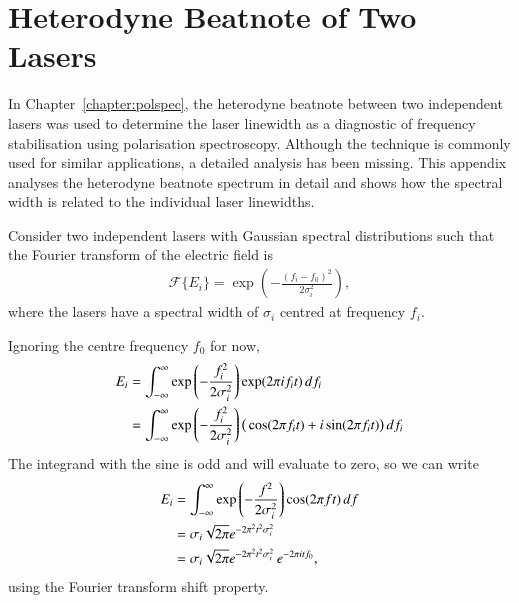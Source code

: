 \chapter{Heterodyne Beatnote of Two Lasers}\label{appendix:heterodyne}

In Chapter~\ref{chapter:polspec}, the heterodyne beatnote between two independent lasers was used to determine the laser linewidth as a diagnostic of frequency stabilisation using polarisation spectroscopy.
Although the technique is commonly used for similar applications, a detailed analysis has been missing.
This appendix analyses the heterodyne beatnote spectrum in detail and shows how the spectral width is related to the individual laser linewidths.

Consider two independent lasers with Gaussian spectral distributions such that the Fourier transform of the electric field is
\begin{align}
\mathcal{F}\{E_i\} = \exp\left(-\frac{(f_i-f_0)^2}{2\sigma_i^2}\right),
\end{align}
where the lasers have a spectral width of $\sigma_i$ centred at frequency $f_i$.

Ignoring the centre frequency $f_0$ for now,
\begin{align}
E_i &= \int_{-\infty}^{\infty} \exp\left(-\frac{f_i^2}{2\sigma_i^2}\right) \exp(2\pi i f_i t) \,df_i\notag\\
&= \int_{-\infty}^{\infty} \exp\left(-\frac{f_i^2}{2\sigma_i^2}\right) \big(\cos(2\pi f_i t) + i\sin(2\pi f_i t)\big) \,df_i
\end{align}
The integrand with the sine is odd and will evaluate to zero, so we can write
\begin{align}
E_i &= \int_{-\infty}^{\infty} \exp\left(-\frac{f^2}{2\sigma_i^2}\right)\cos(2\pi f t) \,df\notag\\
&= \sigma_i\sqrt{2 \pi} e^{-2 \pi^2t^2 \sigma_i^2}\notag\\
&= \sigma_i\sqrt{2 \pi} e^{-2 \pi^2t^2 \sigma_i^2}\,e^{-2\pi i t f_0},
\end{align}
using the Fourier transform shift property.


